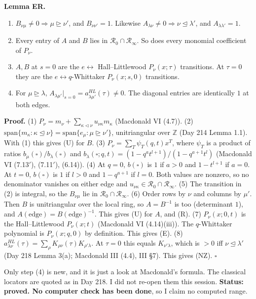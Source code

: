 \documentclass[10pt]{article}
\newcommand{\R}{\mathcal{R}}
\begin{document}
\medskip\noindent\textbf{Lemma ER.}
\begin{enumerate}
\item[(U)] $B_{\nu\mu}\neq0\Rightarrow\mu\trianglerighteq\nu'$, and $B_{\nu\nu'}=1$. Likewise $A_{\lambda\nu}\ne0\Rightarrow\nu\trianglelefteq\lambda'$, and $A_{\lambda\lambda'}=1$.
\item[(R)] Every entry of $A$ and $B$ lies in $\R_0\cap\R_\infty$. So does every monomial coefficient of $P_\nu$.
\item[(E)] $A,B$ at $s=0$ are the $e\leftrightarrow$ Hall--Littlewood $P_\nu(x;\tau)$ transitions. At $\tau=0$ they are the $e\leftrightarrow q$-Whittaker $P_\nu(x;s,0)$ transitions.
\item[(NZ)] For $\mu\trianglerighteq\lambda$, $A_{\lambda\mu'}|_{s=0}=a^{HL}_{\lambda\mu'}(\tau)\neq0$. The diagonal entries are identically $1$ at both edges.
\end{enumerate}

\noindent\textbf{Proof.}
(1) $P_\nu=m_\nu+\sum_{\kappa\triangleleft\nu}u_{\nu\kappa}m_\kappa$ (Macdonald VI (4.7)).
(2) $\mathrm{span}\{m_\kappa:\kappa\trianglelefteq\nu\}=\mathrm{span}\{e_\mu:\mu\trianglerighteq\nu'\}$, unitriangular over $\mathbb{Z}$ (Day 214 Lemma 1.1). With (1) this gives (U) for $B$.
(3) $P_\nu=\sum_T\psi_T(q,t)x^T$, where $\psi_T$ is a product of ratios $b_\mu(\square)/b_\lambda(\square)$ and $b_\lambda(\square;q,t)=(1-q^at^{l+1})/(1-q^{a+1}t^l)$ (Macdonald VI (7.13$'$), (7.11$'$), (6.14)).
(4) At $q=0$, $b(\square)$ is $1$ if $a>0$ and $1-t^{l+1}$ if $a=0$. At $t=0$, $b(\square)$ is $1$ if $l>0$ and $1-q^{a+1}$ if $l=0$. Both values are nonzero, so no denominator vanishes on either edge and $u_{\nu\kappa}\in\R_0\cap\R_\infty$.
(5) The transition in (2) is integral, so the $B_{\nu\mu}$ lie in $\R_0\cap\R_\infty$.
(6) Order rows by $\nu$ and columns by $\mu'$. Then $B$ is unitriangular over the local ring, so $A=B^{-1}$ is too (determinant $1$), and $A(\text{edge})=B(\text{edge})^{-1}$. This gives (U) for $A$, and (R).
(7) $P_\nu(x;0,t)$ is the Hall--Littlewood $P_\nu(x;t)$ (Macdonald VI (4.14)(iii)). The $q$-Whittaker polynomial is $P_\nu(x;q,0)$ by definition. This gives (E).
(8) $a^{HL}_{\lambda\nu}(\tau)=\sum_\rho K_{\rho\nu}(\tau)K_{\rho'\lambda}$. At $\tau=0$ this equals $K_{\nu'\lambda}$, which is $>0$ iff $\nu\trianglelefteq\lambda'$ (Day 218 Lemma 3(a); Macdonald III (4.4), III \S7). This gives (NZ). \hfill$\square$

\medskip\noindent
Only step (4) is new, and it is just a look at Macdonald's formula. The classical locators are quoted as in Day 218. I did not re-open them this session.
\textbf{Status: proved. No computer check has been done}, so I claim no computed range.
\end{document}
